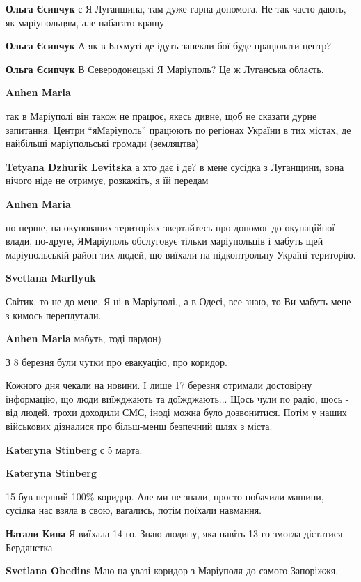 \begin{itemize}
\textbf{Ольга Єсипчук} є Я Луганщина, там дуже гарна допомога. Не так часто дають, як маріупольцям, але набагато кращу

\textbf{Ольга Єсипчук} А як в Бахмуті де ідуть запекли бої буде працювати центр?🤔

\textbf{Ольга Єсипчук} В Северодонецькі Я Маріуполь? Це ж Луганська область.

\textbf{Anhen Maria} 

так в Маріуполі він також не працює, якесь дивне, щоб не сказати дурне
запитання. Центри \enquote{яМаріуполь} працюють по регіонах України в тих містах, де
найбільші маріупольські громади (земляцтва)

\textbf{Tetyana Dzhurik Levitska} а хто дає і де? в мене сусідка з Луганщини, вона нічого ніде не отримує, розкажіть, я їй передам

\textbf{Anhen Maria} 

по-перше, на окупованих територіях звертайтесь про допомог до окупаційної
влади, по-друге, ЯМаріуполь обслуговує тільки маріупольців і мабуть щей
маріупольській район-тих людей, що виїхали на підконтрольну Україні територію.

\textbf{Svetlana Marflyuk} 

Світик, то не до мене. Я ні в Маріуполі., а в Одесі, все знаю, то Ви мабуть мене з кимось переплутали.

\textbf{Anhen Maria} мабуть, тоді пардон)

\end{itemize} %


З 8 березня були чутки про евакуацію, про коридор.

Кожного дня чекали на новини. І лише 17 березня отримали достовірну інформацію,
що люди виїжджають та доїжджають... Щось чули по радіо, щось - від людей, трохи
доходили СМС, іноді можна було дозвонитися. Потім у наших військових дізналися
про більш-менш безпечний шлях з міста.

\begin{itemize} %
\textbf{Kateryna Stinberg} с 5 марта.

\textbf{Kateryna Stinberg} 

15 був перший 100\% коридор. Але ми не знали, просто побачили машини, сусідка
нас взяла в свою, вагались, потім поїхали навмання.

\textbf{Натали Кина} Я виїхала 14-го. Знаю людину, яка навіть 13-го змогла дістатися Бердянстка

\textbf{Svetlana Obedins} Маю на увазі коридор з Маріуполя до самого Запоріжжя.
\end{itemize} %

